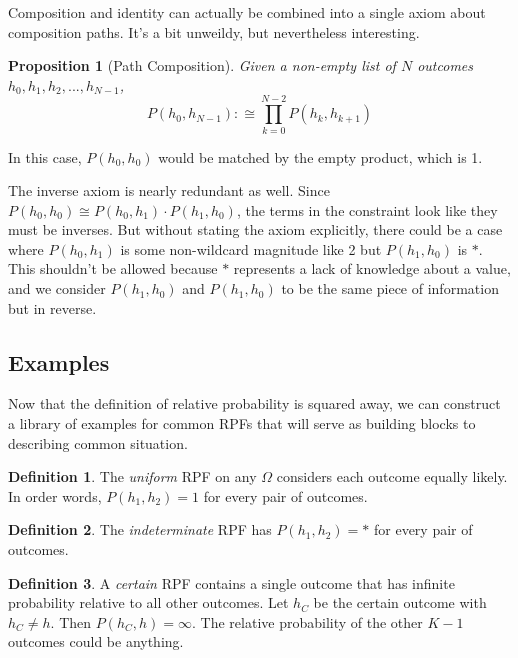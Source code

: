 \documentclass[twoside]{article}
\theoremstyle{plain}%
\newtheorem{proposition}[theorem]{Proposition}
\theoremstyle{definition}
\newtheorem{definition}{Definition}[section]
\theoremstyle{remark}
\begin{document}
Composition and identity can actually be combined into a single axiom about composition paths. It's a bit unweildy, but nevertheless interesting.

\begin{proposition}[Path Composition]
Given a non-empty list of \(N\) outcomes \(h_0, h_1, h_2, ..., h_{N-1}\), \[P(h_0, h_{N-1}) :\cong \prod_{k=0}^{N-2} P(h_k, h_{k+1}) \]
\end{proposition}

In this case, \(P(h_0, h_0)\) would be matched by the empty product, which is 1.

The inverse axiom is nearly redundant as well. Since \(P(h_0, h_0) \cong P(h_0, h_1) \cdot P(h_1, h_0)\), the terms in the constraint look like they must be inverses. But without stating the axiom explicitly, there could be a case where \(P(h_0, h_1)\) is some non-wildcard magnitude like 2 but \(P(h_1, h_0)\) is \(\ast\). This shouldn't be allowed because \(\ast\) represents a lack of knowledge about a value, and we consider \(P(h_1, h_0)\) and \(P(h_1, h_0)\) to be the same piece of information but in reverse.

\subsection{Examples}

Now that the definition of relative probability is squared away, we can construct a library of examples for common RPFs that will serve as building blocks to describing common situation.

\begin{definition}
\label{def:uniform_rpf}
The \textit{uniform} RPF on any \(\Omega\) considers each outcome equally likely. In order words, \(P(h_1, h_2) = 1\) for every pair of outcomes.
\end{definition}

\begin{definition}
\label{def:indeterminate_rpf}
The \textit{indeterminate} RPF has \(P(h_1, h_2) = \ast\) for every pair of outcomes.
\end{definition}

\begin{definition}
A \textit{certain} RPF contains a single outcome that has infinite probability relative to all other outcomes. Let \(h_C\) be the certain outcome with \(h_C \neq h\). Then \(P(h_C, h) = \infty\). The relative probability of the other \(K-1\) outcomes could be anything.
\end{definition}
\end{document}
